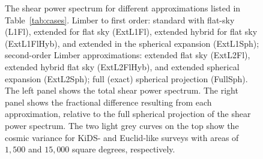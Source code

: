 \documentclass[fleqn,usenatbib]{mnras} %
\begin{document}
\begin{figure}
  \caption{\label{fig:Cl_cases}%
        The shear power spectrum for different approximations listed in Table~\ref{tab:cases}.
        Limber to first order: standard with flat-sky (L1Fl),
        extended for flat sky (ExtL1Fl), extended hybrid for flat sky (ExtL1FlHyb),
        and extended in the spherical expansion (ExtL1Sph);
        second-order Limber approximations: extended flat sky (ExtL2Fl), extended hybrid flat sky (ExtL2FlHyb),
        and extended spherical expansion (ExtL2Sph); full (exact) spherical projection (FullSph).
        The left panel shows the total shear power spectrum.  The right panel shows the fractional difference
        resulting from each approximation, 
        relative to the full spherical projection of the shear power spectrum. The two light grey curves on the
        top show the cosmic variance for KiDS- and Euclid-like surveys with areas of $1,500$ and $15,000$
        square degrees, respectively.
        }
\end{figure}
\end{document}
